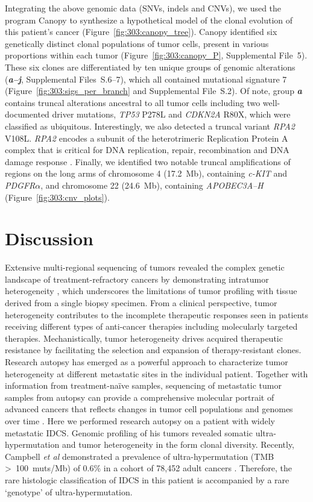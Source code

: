 Integrating the above genomic data (SNVs, indels and CNVs), we used the program Canopy \cite{canopy} to synthesize a hypothetical model of the clonal evolution of this patient's cancer (Figure~\ref{fig:303:canopy_tree}). Canopy identified six genetically distinct clonal populations of tumor cells, present in various proportions within each tumor (Figure~\ref{fig:303:canopy_P}, Supplemental File~5). These six clones are differentiated by ten unique groups of genomic alterations (\textbf{\textit{a--j}}, Supplemental Files~S\thechapter{}.6--7), which all contained mutational signature 7 (Figure~\ref{fig:303:sigs_per_branch} and Supplemental File~S\thechapter{}.2). Of note, group \textbf{\textit{a}} contains truncal alterations ancestral to all tumor cells including two well-documented driver mutations, \textit{TP53} P278L and \textit{CDKN2A} R80X, which were classified as ubiquitous. Interestingly, we also detected a truncal variant \textit{RPA2} V108L\@. \textit{RPA2} encodes a subunit of the heterotrimeric Replication Protein A complex that is critical for DNA replication, repair, recombination and DNA damage response \cite{byrne2019}. Finally, we identified two notable truncal amplifications of regions on the long arms of chromosome 4 (\textapprox{}17.2~Mb), containing \textit{c-KIT} and \textit{PDGFR}$\mathit{\alpha}$, and chromosome 22 (\textapprox{}24.6~Mb), containing \textit{APOBEC3A--H} (Figure~\ref{fig:303:cnv_plots}).

\section{Discussion}
Extensive multi-regional sequencing of tumors revealed the complex genetic landscape of treatment-refractory cancers by demonstrating intratumor heterogeneity \cite{gerlinger2012,gerlinger2014}, which underscores the limitations of tumor profiling with tissue derived from a single biopsy specimen. From a clinical perspective, tumor heterogeneity contributes to the incomplete therapeutic responses seen in patients receiving different types of anti-cancer therapies including molecularly targeted therapies. Mechanistically, tumor heterogeneity drives acquired therapeutic resistance by facilitating the selection and expansion of therapy-resistant clones. Research autopsy has emerged as a powerful approach to characterize tumor heterogeneity at different metastatic sites in the individual patient. Together with information from treatment-na\"ive samples, sequencing of metastatic tumor samples from autopsy can provide a comprehensive molecular portrait of advanced cancers that reflects changes in tumor cell populations and genomes over time \cite{faltas2016,juric2015}. Here we performed research autopsy on a patient with widely metastatic IDCS. Genomic profiling of his tumors revealed somatic ultra-hypermutation and tumor heterogeneity in the form clonal diversity. Recently, Campbell \textit{et al} demonstrated a prevalence of ultra-hypermutation (TMB \textgreater{}~100~muts/Mb) of 0.6\% in a cohort of 78,452 adult cancers \cite{campbell2017}. Therefore, the rare histologic classification of IDCS in this patient is accompanied by a rare `genotype' of ultra-hypermutation.

